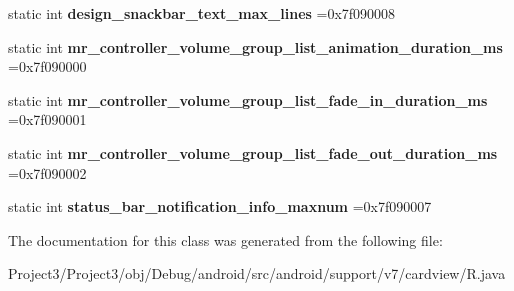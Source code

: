 \begin{DoxyCompactItemize}
static int {\bfseries design\+\_\+snackbar\+\_\+text\+\_\+max\+\_\+lines} =0x7f090008
\item 
\mbox{\label{classandroid_1_1support_1_1v7_1_1cardview_1_1R_1_1integer_a29861ea4eab2c79fe7701e476203e7c3}} 
static int {\bfseries mr\+\_\+controller\+\_\+volume\+\_\+group\+\_\+list\+\_\+animation\+\_\+duration\+\_\+ms} =0x7f090000
\item 
\mbox{\label{classandroid_1_1support_1_1v7_1_1cardview_1_1R_1_1integer_a5f1931ca16a1aeaa4040922b4552366c}} 
static int {\bfseries mr\+\_\+controller\+\_\+volume\+\_\+group\+\_\+list\+\_\+fade\+\_\+in\+\_\+duration\+\_\+ms} =0x7f090001
\item 
\mbox{\label{classandroid_1_1support_1_1v7_1_1cardview_1_1R_1_1integer_ad22b054ac1ed59cf9b8124506c7f8b2d}} 
static int {\bfseries mr\+\_\+controller\+\_\+volume\+\_\+group\+\_\+list\+\_\+fade\+\_\+out\+\_\+duration\+\_\+ms} =0x7f090002
\item 
\mbox{\label{classandroid_1_1support_1_1v7_1_1cardview_1_1R_1_1integer_af01e5216847571e893a14a0ca5470daa}} 
static int {\bfseries status\+\_\+bar\+\_\+notification\+\_\+info\+\_\+maxnum} =0x7f090007
\end{DoxyCompactItemize}


The documentation for this class was generated from the following file\+:\begin{DoxyCompactItemize}
\item 
Project3/\+Project3/obj/\+Debug/android/src/android/support/v7/cardview/R.\+java\end{DoxyCompactItemize}

